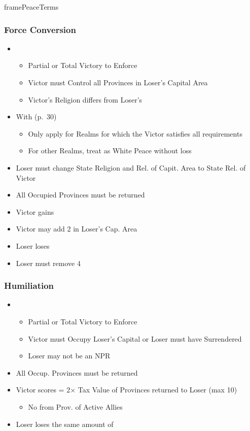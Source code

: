 \documentclass[10pt]{article}
\begin{document}
\begin{dynamiccontents*}{framePeaceTerms}
\begin{multicols}{3}
		\subsubsection*{Force Conversion}
		\begin{itemize}
			\item {}
			\begin{itemize}
				\item Partial or Total Victory to Enforce
				\item Victor must Control all Provinces in Loser's Capital Area
				\item Victor's Religion differs from Loser's
			\end{itemize}
			\item With  (p.~30)
			\begin{itemize}
				\item Only apply for Realms for which the Victor satisfies all requirements
				\item For other Realms, treat as White Peace without \prestige loss
			\end{itemize}
			\item Loser must change State Religion and Rel. of Capit. Area to State Rel. of Victor
			\item All Occupied Provinces must be returned
			\item Victor gains 
			\item Victor may add 2 \influence in Loser's Cap. Area
			\item Loser loses 
			\item Loser must remove 4 \influence
		\end{itemize}

		\subsubsection*{Humiliation}
		\begin{itemize}
			\item {}
			\begin{itemize}
				\item Partial or Total Victory to Enforce
				\item Victor must Occupy Loser's Capital or Loser must have Surrendered
				\item Loser may not be an NPR
			\end{itemize}
			\item All Occup. Provinces must be returned
			\item Victor scores \prestige = 2× Tax Value of Provinces returned to Loser (max 10)
			\begin{itemize}
				\item No \prestige from Prov. of Active Allies
			\end{itemize}
			\item Loser loses the same amount of \prestige
		\end{itemize}


\end{multicols}
\end{dynamiccontents*}
\end{document}
